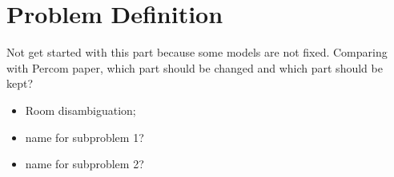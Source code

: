 \section{Problem Definition}
\label{sec:def}
Not get started with this part because some models are not fixed. 
Comparing with Percom paper, which part should be changed and which part should be kept? 
\begin{itemize}
    \item Room disambiguation;
    \item name for subproblem 1?
    \item name for subproblem 2?
\end{itemize}